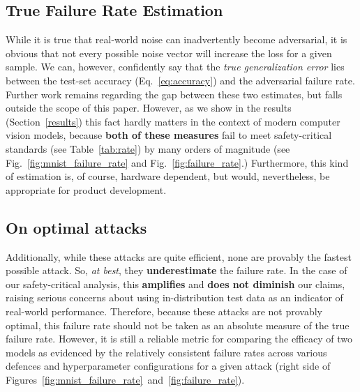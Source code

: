 \subsection{True Failure Rate Estimation}
While it is true that real-world noise can inadvertently become adversarial, it is obvious that not every possible noise vector will increase the loss for a given sample.
We can, however, confidently say that the \textit{true generalization error} lies between the test-set accuracy (Eq.~\ref{eq:accuracy}) and the adversarial failure rate.
Further work remains regarding the gap between these two estimates, but falls outside the scope of this paper.
However, as we show in the results (Section~\ref{results}) this fact hardly matters in the context of modern computer vision models, because \textbf{both of these measures} fail to meet safety-critical standards (see Table~\ref{tab:rate}) by many orders of magnitude (see Fig.~\ref{fig:mnist_failure_rate} and Fig.~\ref{fig:failure_rate}.)
Furthermore, this kind of estimation is, of course, hardware dependent, but would,  nevertheless, be appropriate for product development.

\subsection{On optimal attacks}
Additionally, while these attacks are quite efficient, none are provably the fastest possible attack.
So, \textit{at best}, they \textbf{underestimate} the failure rate.
In the case of our safety-critical analysis, this \textbf{amplifies} and \textbf{does not diminish} our claims, raising serious concerns about using in-distribution test data as an indicator of real-world performance.
Therefore, because these attacks are not provably optimal, this failure rate should not be taken as an absolute measure of the true failure rate.
However, it is still a reliable metric for comparing the efficacy of two models as evidenced by the relatively consistent failure rates across various defences and hyperparameter configurations for a given attack (right side of Figures~\ref{fig:mnist_failure_rate}~and~\ref{fig:failure_rate}).
